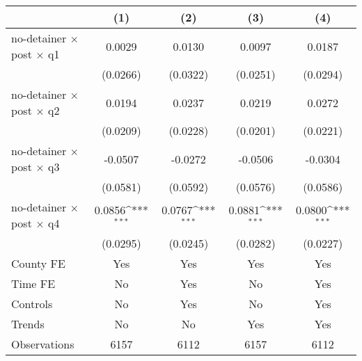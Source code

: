 {
\def\sym#1{\ifmmode^{#1}\else\(^{#1}\)\fi}
\begin{tabular*}{0.7\textwidth}{@{\hskip\tabcolsep\extracolsep\fill}l*{4}{c}}
\hline\hline
                    &\multicolumn{1}{c}{(1)}         &\multicolumn{1}{c}{(2)}         &\multicolumn{1}{c}{(3)}         &\multicolumn{1}{c}{(4)}         \\
\hline
no-detainer $\times$ post $\times$ q1&      0.0029         &      0.0130         &      0.0097         &      0.0187         \\
                    &    (0.0266)         &    (0.0322)         &    (0.0251)         &    (0.0294)         \\
[1em]
no-detainer $\times$ post $\times$ q2&      0.0194         &      0.0237         &      0.0219         &      0.0272         \\
                    &    (0.0209)         &    (0.0228)         &    (0.0201)         &    (0.0221)         \\
[1em]
no-detainer $\times$ post $\times$ q3&     -0.0507         &     -0.0272         &     -0.0506         &     -0.0304         \\
                    &    (0.0581)         &    (0.0592)         &    (0.0576)         &    (0.0586)         \\
[1em]
no-detainer $\times$ post $\times$ q4&      0.0856\sym{***}&      0.0767\sym{***}&      0.0881\sym{***}&      0.0800\sym{***}\\
                    &    (0.0295)         &    (0.0245)         &    (0.0282)         &    (0.0227)         \\
[1em]
County FE           &         Yes         &         Yes         &         Yes         &         Yes         \\
[1em]
Time FE             &          No         &         Yes         &          No         &         Yes         \\
[1em]
Controls            &          No         &         Yes         &          No         &         Yes         \\
[1em]
Trends              &          No         &          No         &         Yes         &         Yes         \\
\hline
Observations        &        6157         &        6112         &        6157         &        6112         \\
\hline\hline
\end{tabular*}
}
